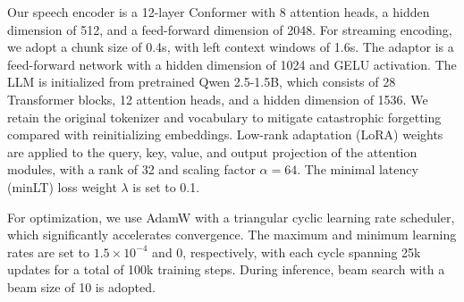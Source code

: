 \documentclass{article}
\begin{document}
Our speech encoder is a 12-layer Conformer with 8 attention heads, a hidden dimension of 512, and a feed-forward dimension of 2048. For streaming encoding, we adopt a chunk size of 0.4s, with left context windows of 1.6s. The adaptor is a feed-forward network with a hidden dimension of 1024 and GELU activation.
The LLM is initialized from pretrained Qwen 2.5-1.5B, which consists of 28 Transformer blocks, 12 attention heads, and a hidden dimension of 1536. We retain the original tokenizer and vocabulary to mitigate catastrophic forgetting compared with reinitializing embeddings. Low-rank adaptation (LoRA) weights are applied to the query, key, value, and output projection of the attention modules, with a rank of 32 and scaling factor $\alpha = 64$. The minimal latency (minLT) loss weight $\lambda$ is set to 0.1.

For optimization, we use AdamW with a triangular cyclic learning rate scheduler, which significantly accelerates convergence. The maximum and minimum learning rates are set to $1.5 \times 10^{-4}$ and 0, respectively, with each cycle spanning 25k updates for a total of 100k training steps. During inference, beam search with a beam size of 10 is adopted. 

% 


\end{document}
